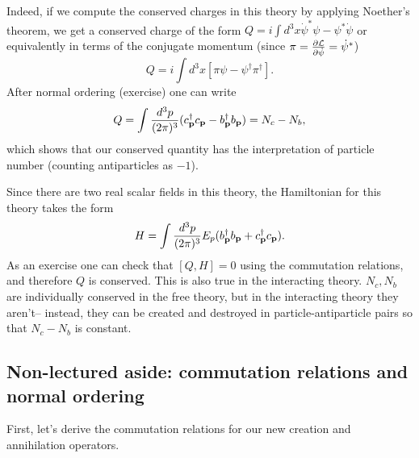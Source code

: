 Indeed, if we compute the conserved charges in this theory by applying Noether's theorem, we get a conserved charge of the form
$Q=i\int d^3 x \dot \psi^* \psi - \psi^* \dot \psi$ or equivalently in terms of the conjugate momentum (since $\pi = \frac{\partial \mathcal L}{\partial \dot \psi}=\dot \psi^*$)
$$Q=i\int d^3 x [\pi \psi - \psi^\dagger \pi^\dagger].$$
After normal ordering (exercise) one can write
$$Q=\int \frac{d^3 p}{(2\pi)^3} (c_{\boldsymbol{\mathbf{p}}}^\dagger c_{\boldsymbol{\mathbf{p}}}- b_{\boldsymbol{\mathbf{p}}}^\dagger b_{\boldsymbol{\mathbf{p}}})=N_c-N_b,$$
which shows that our conserved quantity has the interpretation of particle number (counting antiparticles as $-1$).

Since there are two real scalar fields in this theory, the Hamiltonian for this theory takes the form
$$H=\int \frac{d^3p}{(2\pi)^3} E_p(b_{\boldsymbol{\mathbf{p}}}^\dagger b_{\boldsymbol{\mathbf{p}}}+c_{\boldsymbol{\mathbf{p}}}^\dagger c_{\boldsymbol{\mathbf{p}}}).$$
As an exercise one can check that $[Q,H]=0$ using the commutation relations, and therefore $Q$ is conserved. This is also true in the interacting theory. $N_c,N_b$ are individually conserved in the free theory, but in the interacting theory they aren't-- instead, they can be created and destroyed in particle-antiparticle pairs so that $N_c-N_b$ is constant.

\subsection*{Non-lectured aside: commutation relations and normal ordering}
First, let's derive the commutation relations for our new creation and annihilation operators.%
